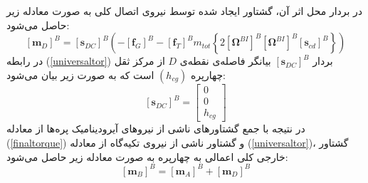  در بردار محل اثر آن، گشتاور ایجاد شده
توسط نیروی اتصال کلی به صورت معادله زیر حاصل می‌شود:
\begin{equation}\label{universaltor}
	\left[\boldsymbol m_D\right]^B = \left[\boldsymbol s_{DC}\right]^B\left(
	-\left[\boldsymbol f_G\right]^B
	-\left[\boldsymbol f_T\right]^B
	m_{tot}\left\{2
	\left[\boldsymbol \Omega^{BI}\right]^B
	\left[\boldsymbol \Omega^{BI}\right]^B
	\left[\boldsymbol s_{cd}\right]^B
	\right\}
	\right)
\end{equation}
در رابطه
(\ref{universaltor})
بردار 
$\left[\boldsymbol s_{DC}\right]^B$
بیانگر فاصله‌ی نقطه‌ی 
$D$
از مرکز ثقل چهارپره 
$(h_{cg})$
است که به صورت زیر بیان می‌شود:
\begin{equation}
	\left[\boldsymbol s_{DC}\right]^B = \begin{bmatrix}
		0\\0\\h_{cg}
	\end{bmatrix}
\end{equation}
 در نتیجه با جمع گشتاورهای ناشی از نیروهای آیرودینامیک پره‌ها از معادله 
(\ref{finaltorque})
 و گشتاور ناشی 
از نیروی تكیه‌گاه از معادله 
(\ref{universaltor})، گشتاور خارجی کلی اعمالی به چهارپره به صورت معادله زیر حاصل 
می‌شود:
\begin{equation}\label{finalm}
	\left[\boldsymbol m_B\right]^B = 
	\left[\boldsymbol m_A\right]^B+
	\left[\boldsymbol m_D\right]^B
\end{equation}

